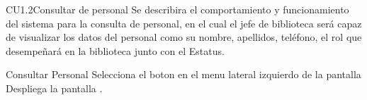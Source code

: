 \begin{UseCase}{CU1.2}{Consultar de personal}{
	Se describira el comportamiento y funcionamiento del sistema para la consulta de personal, en el cual el jefe de biblioteca será capaz de visualizar los datos del personal como su nombre, apellidos, teléfono, el rol que desempeñará en la biblioteca junto con el Estatus.
}
	\end{UseCase}
	\begin{UCtrayectoria}{Consultar Personal}
		\UCpaso[\UCactor]Selecciona el boton  en el menu lateral izquierdo de la pantalla 
		\UCpaso[\UCsist] Despliega la pantalla .			
	\end{UCtrayectoria}


